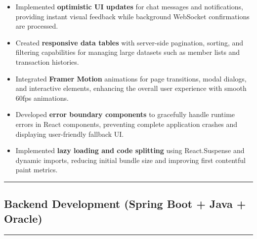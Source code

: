 \documentclass[
  12pt,
  a4paperpaper,
]{report}
\begin{document}
\begin{itemize}
  Built \textbf{protected route guards} that intercept navigation
  attempts, verifying JWT validity and role permissions before granting
  access to role-restricted pages.
\item
  Implemented \textbf{optimistic UI updates} for chat messages and
  notifications, providing instant visual feedback while background
  WebSocket confirmations are processed.
\item
  Created \textbf{responsive data tables} with server-side pagination,
  sorting, and filtering capabilities for managing large datasets such as
  member lists and transaction histories.
\item
  Integrated \textbf{Framer Motion} animations for page transitions,
  modal dialogs, and interactive elements, enhancing the overall user
  experience with smooth 60fps animations.
\item
  Developed \textbf{error boundary components} to gracefully handle
  runtime errors in React components, preventing complete application
  crashes and displaying user-friendly fallback UI.
\item
  Implemented \textbf{lazy loading and code splitting} using React.Suspense
  and dynamic imports, reducing initial bundle size and improving first
  contentful paint metrics.
\end{itemize}

\smallskip\noindent

\rule{\textwidth}{0.3pt}

\subsection{Backend Development (Spring Boot + Java +
Oracle)}\label{backend-development-spring-boot-java-oracle}

\noindent

\rule{\textwidth}{0.3pt}\medskip
\end{document}
